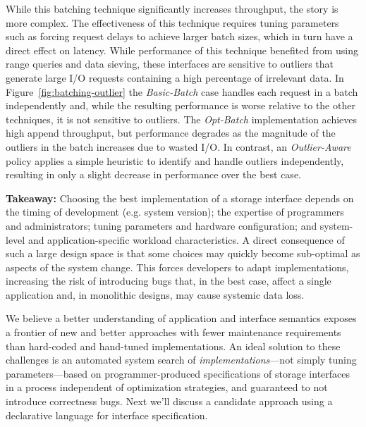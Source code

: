 While this batching technique significantly increases throughput, the story is
more complex. The effectiveness of this technique requires tuning parameters
such as forcing request delays to achieve larger batch sizes, which in turn
have a direct effect on latency. While performance of this technique benefited
from using range queries and data sieving, these interfaces are sensitive to
outliers that generate large I/O requests containing a high percentage of
irrelevant data.  In Figure~\ref{fig:batching-outlier} the \emph{Basic-Batch}
case handles each request in a batch independently and, while the resulting
performance is worse relative to the other techniques, it is not sensitive to
outliers. The \emph{Opt-Batch} implementation achieves high append throughput,
but performance degrades as the magnitude of the outliers in the batch
increases due to wasted I/O. In contrast, an \emph{Outlier-Aware} policy
applies a simple heuristic to identify and handle outliers independently,
resulting in only a slight decrease in performance over the best case.

\textbf{Takeaway:} Choosing the best implementation of a storage interface
depends on the timing of development (e.g. system version); the expertise of
programmers and administrators; tuning parameters and hardware configuration;
and system-level and application-specific workload characteristics. A
direct consequence of such a large design space is that some choices may
quickly become sub-optimal as aspects of the system change.  This forces
developers to adapt implementations, increasing the risk of introducing bugs that, in the
best case, affect a single application and, in monolithic designs, may
cause systemic data loss.

We believe a better understanding of application and interface semantics
exposes a frontier of new and better approaches with fewer maintenance
requirements than hard-coded and hand-tuned implementations. An ideal solution
to these challenges is an automated system search of
\emph{implementations}---not simply tuning parameters---based on
programmer-produced specifications of storage interfaces in a process
independent of optimization strategies, and guaranteed to not introduce
correctness bugs. Next we'll discuss a candidate approach using a declarative
language for interface specification.
